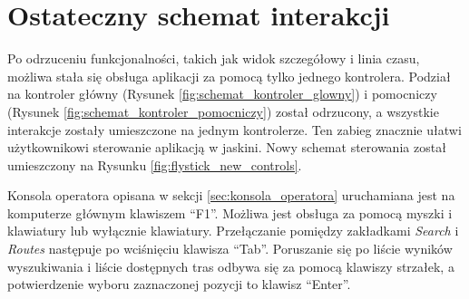 \section{Ostateczny schemat interakcji}
\label{sec:schemat_interakcji}
Po odrzuceniu funkcjonalności, takich jak widok szczegółowy i linia czasu, możliwa stała się obsługa aplikacji za pomocą tylko jednego kontrolera. Podział na kontroler główny (Rysunek \ref{fig:schemat_kontroler_glowny}) i pomocniczy (Rysunek \ref{fig:schemat_kontroler_pomocniczy}) został odrzucony, a wszystkie interakcje zostały umieszczone na jednym kontrolerze. Ten zabieg znacznie ułatwi użytkownikowi sterowanie aplikacją w jaskini. Nowy schemat sterowania został umieszczony na Rysunku \ref{fig:flystick_new_controls}.


Konsola operatora opisana w sekcji \ref{sec:konsola_operatora} uruchamiana jest na komputerze głównym klawiszem ``F1''. Możliwa jest obsługa za pomocą myszki i klawiatury lub wyłącznie klawiatury. Przełączanie pomiędzy zakładkami \textit{Search} i \textit{Routes} następuje po wciśnięciu klawisza ``Tab''. Poruszanie się po liście wyników wyszukiwania i liście dostępnych tras odbywa się za pomocą klawiszy strzałek, a potwierdzenie wyboru zaznaczonej pozycji to klawisz ``Enter''.